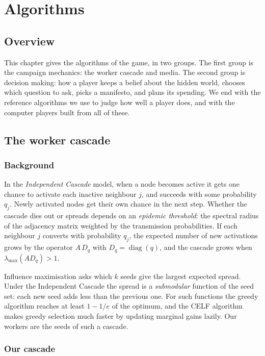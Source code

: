 \documentclass[11pt,a4paper,oneside]{report}
\newcommand{\overviewsection}{\section{Overview}}
\begin{document}
\chapter{Algorithms}\label{ch:algorithms}

\overviewsection

This chapter gives the algorithms of the game, in two groups. The first group is the campaign mechanics:
the worker cascade and media. The second group is decision making: how a player keeps a belief about the
hidden world, chooses which question to ask, picks a manifesto, and plans its spending. We end with the
reference algorithms we use to judge how well a player does, and with the computer players built from all
of these.

\section{The worker cascade}

\subsection{Background}

In the \emph{Independent Cascade} model, when a node becomes active it gets
one chance to activate each inactive neighbour $j$, and succeeds with some probability $q_j$. Newly
activated nodes get their own chance in the next step. Whether the cascade dies out or spreads depends on
an \emph{epidemic threshold}: the spectral radius of the adjacency matrix weighted by the transmission
probabilities. If each neighbour $j$ converts with probability $q_j$, the
expected number of new activations grows by the operator $A\,D_q$ with $D_q=\operatorname{diag}(q)$, and
the cascade grows when $\lambda_{\max}(A D_q) > 1$.

Influence maximisation asks which $k$ seeds give the largest expected spread. Under the Independent
Cascade the spread is a \emph{submodular} function of the seed set: each new seed adds less than the
previous one. For such functions the greedy algorithm reaches at least $1-1/e$ of the
optimum, and the CELF algorithm makes greedy selection much faster by updating
marginal gains lazily. Our workers are the seeds of such a cascade.

\subsection{Our cascade}
\end{document}
